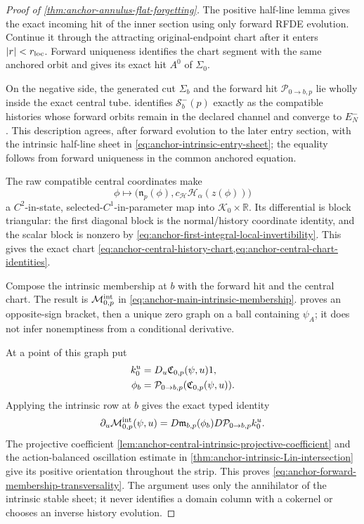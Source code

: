 \begin{proof}[Proof of \cref{thm:anchor-annulus-flat-forgetting}]
The positive half-line lemma gives the exact incoming hit of the inner
section using only forward RFDE evolution.  Continue it through the
attracting original-endpoint chart after it enters
\(|r|<r_{\rm loc}\).  Forward uniqueness identifies the chart segment with
the same anchored orbit and gives its exact hit \(A^0\) of \(\Sigma_0\).

On the negative side, the generated cut \(\Sigma_b\) and the forward hit
\(\mathcal P_{0\to b,p}\) lie wholly inside the exact central tube.
 identifies
\(\mathcal S_b^-(p)\) exactly as the compatible histories whose forward
orbits remain in the declared channel and converge to \(E_N^-\).  This
description agrees, after forward evolution to the later entry section,
with the intrinsic half-line sheet in
\cref{eq:anchor-intrinsic-entry-sheet}; the equality follows from forward
uniqueness in the common anchored equation.

The raw compatible central coordinates make
\[
 \phi\longmapsto
 \bigl(\mathfrak n_p(\phi),
       c_{\mathscr H}\mathscr H_\alpha(z(\phi))\bigr)
\]
a \(C^2\)-in-state, selected-\(C^1\)-in-parameter map into
\(\mathscr K_0\times\mathbb R\).  Its differential is block triangular:
the first diagonal block is the normal/history coordinate identity, and
the scalar block is nonzero by
\cref{eq:anchor-first-integral-local-invertibility}.  This gives the exact
chart
\cref{eq:anchor-central-history-chart,eq:anchor-central-chart-identities}.

Compose the intrinsic membership at \(b\) with the forward hit and the
central chart.  The result is \(\mathcal M_{0,p}^{\rm int}\) in
\cref{eq:anchor-main-intrinsic-membership}.
 proves an opposite-sign bracket,
then a unique zero graph on a ball containing \(\psi_A\); it does not infer
nonemptiness from a conditional derivative.

At a point of this graph put
\begin{align}
 k_0^u&=D_u\mathfrak C_{0,p}(\psi,u)1,\notag\\
 \phi_b&=\mathcal P_{0\to b,p}
              (\mathfrak C_{0,p}(\psi,u)).
                                                               \label{eq:anchor-central-entry-column-data}
\end{align}
Applying the intrinsic row at \(b\) gives the exact typed identity
\begin{equation}
 \partial_u\mathcal M_{0,p}^{\rm int}(\psi,u)
 =D\mathfrak m_{b,p}(\phi_b)
      D\mathcal P_{0\to b,p}k_0^u.                  \label{eq:anchor-forward-column-coefficient-identity}
\end{equation}
The projective coefficient
\cref{lem:anchor-central-intrinsic-projective-coefficient} and the
action-balanced oscillation estimate in
\cref{thm:anchor-intrinsic-Lin-intersection} give its positive orientation
throughout the strip.  This proves
\cref{eq:anchor-forward-membership-transversality}.  The argument uses only
the annihilator of the intrinsic stable sheet; it never identifies a domain
column with a cokernel or chooses an inverse history evolution.


\end{proof}
